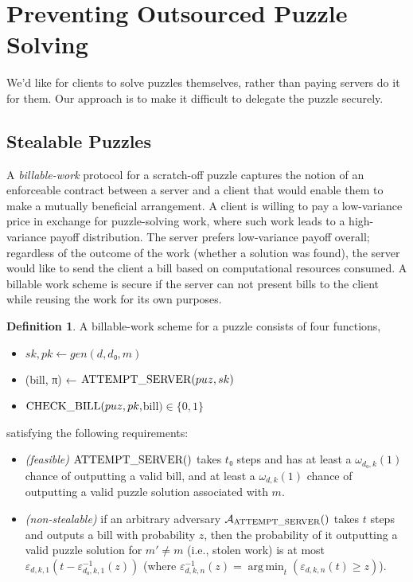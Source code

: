 \documentclass{article}
\theoremstyle{definition}
\newtheorem{definition}{Definition}
\theoremstyle{remark}
\DeclareMathOperator*{\ArgMin}{arg\,min}
\newcommand{\argmin}[1]{\displaystyle{\ArgMin_{#1}}}
\newcommand{\Adv}{\mathcal{A}}
\newcommand{\tn}{\textnormal}
\newcommand{\unn}[1]{\uppercase\tn{#1}}
\begin{document}
\section{Preventing Outsourced Puzzle Solving}

We'd like for clients to solve puzzles themselves, rather than paying servers do it for them. Our approach is to make it difficult to delegate the puzzle securely.

\subsection{Stealable Puzzles}

A {\em billable-work} protocol for a scratch-off puzzle captures the notion of an enforceable contract between a server and a client that would enable them to make a mutually beneficial arrangement. A client is willing to pay a low-variance price in exchange for puzzle-solving work, where such work leads to a high-variance payoff distribution. The server prefers low-variance payoff overall; regardless of the outcome of the work (whether a  solution was found), the server would like to send the client a bill based on computational resources consumed. A billable work scheme is secure if the server can not present bills to the client while reusing the work for its own purposes.

\begin{definition}A billable-work scheme for a puzzle consists of four functions,
\begin{itemize}
\item $sk,pk ← gen(d,d₀,m)$
\item (bill, π) ← $\unn{attempt\_server}(puz, sk)$
\item $\unn{check\_bill}(puz, pk, $bill$) ∈ \{0,1\}$
\end{itemize}
satisfying the following requirements:
\begin{itemize}
\item {\em (feasible)} $\unn{attempt\_server}()$ takes $t₀$ steps and has at least a $ω_{d₀,k}(1)$ chance of outputting a valid bill, and at least a $ω_{d,k}(1)$ chance of outputting a valid puzzle solution associated with $m$.
\item {\em (non-stealable)} if an arbitrary adversary $\Adv_{\unn{attempt\_server}}()$ takes $t$ steps and outputs a bill with probability $z$, then the probability of it outputting a valid puzzle solution for $m'≠m$ (i.e., stolen work) is at most $ε_{d,k,1}(t - ε^{-1}_{d₀,k,1}(z))$ (where $ε^{-1}_{d,k,n}(z) = \argmin{t}(ε_{d,k,n}(t) ≥ z)$).
\end{itemize}
\end{definition}
\end{document}
